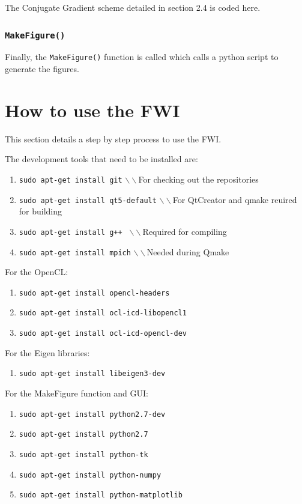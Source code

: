 \documentclass[10pt,a4paper]{article}
\begin{document}
The Conjugate Gradient scheme detailed in section 2.4 is coded here.

\subsubsection{\texttt{MakeFigure()}}

Finally, the \texttt{MakeFigure()} function is called which calls a python script to generate the figures.

\section{How to use the FWI}

This section details a step by step process to use the FWI.


The development tools that need to be installed are:
\begin{enumerate}
    \item \texttt{sudo apt-get install git}  $\backslash\backslash$For checking out the repositories
    \item \texttt{sudo apt-get install qt5-default}  $\backslash\backslash$For QtCreator and qmake reuired for building
    \item \texttt{sudo apt-get install g++ }  $\backslash\backslash$Required for compiling
    \item \texttt{sudo apt-get install mpich}  $\backslash\backslash$Needed during Qmake
\end{enumerate}

For the OpenCL:
\begin{enumerate}
    \item \texttt{sudo apt-get install opencl-headers}
    \item \texttt{sudo apt-get install ocl-icd-libopencl1}
    \item \texttt{sudo apt-get install ocl-icd-opencl-dev}
\end{enumerate}


For the Eigen libraries:
\begin{enumerate}
    \item \texttt{sudo apt-get install libeigen3-dev}
\end{enumerate}


For the MakeFigure function and GUI:

\begin{enumerate}
    \item \texttt{sudo apt-get install python2.7-dev}
    \item \texttt{sudo apt-get install python2.7}
    \item \texttt{sudo apt-get install python-tk}
    \item \texttt{sudo apt-get install python-numpy}
    \item \texttt{sudo apt-get install python-matplotlib}
\end{enumerate}
\end{document}
